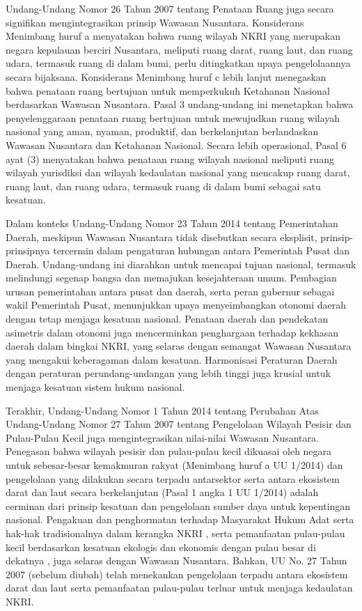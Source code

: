 \documentclass[12pt, a4paper]{article}
\begin{document}
Undang-Undang Nomor 26 Tahun 2007 tentang Penataan Ruang juga secara signifikan mengintegrasikan prinsip Wawasan Nusantara. Konsiderans Menimbang huruf a menyatakan bahwa ruang wilayah NKRI yang merupakan negara kepulauan berciri Nusantara, meliputi ruang darat, ruang laut, dan ruang udara, termasuk ruang di dalam bumi, perlu ditingkatkan upaya pengelolaannya secara bijaksana. Konsiderans Menimbang huruf c lebih lanjut menegaskan bahwa penataan ruang bertujuan untuk memperkukuh Ketahanan Nasional berdasarkan Wawasan Nusantara. Pasal 3 undang-undang ini menetapkan bahwa penyelenggaraan penataan ruang bertujuan untuk mewujudkan ruang wilayah nasional yang aman, nyaman, produktif, dan berkelanjutan berlandaskan Wawasan Nusantara dan Ketahanan Nasional. Secara lebih operasional, Pasal 6 ayat (3) menyatakan bahwa penataan ruang wilayah nasional meliputi ruang wilayah yurisdiksi dan wilayah kedaulatan nasional yang mencakup ruang darat, ruang laut, dan ruang udara, termasuk ruang di dalam bumi sebagai satu kesatuan.  

Dalam konteks Undang-Undang Nomor 23 Tahun 2014 tentang Pemerintahan Daerah, meskipun Wawasan Nusantara tidak disebutkan secara eksplisit, prinsip-prinsipnya tercermin dalam pengaturan hubungan antara Pemerintah Pusat dan Daerah. Undang-undang ini diarahkan untuk mencapai tujuan nasional, termasuk melindungi segenap bangsa dan memajukan kesejahteraan umum. Pembagian urusan pemerintahan antara pusat dan daerah, serta peran gubernur sebagai wakil Pemerintah Pusat, menunjukkan upaya menyeimbangkan otonomi daerah dengan tetap menjaga kesatuan nasional. Penataan daerah dan pendekatan asimetris dalam otonomi juga mencerminkan penghargaan terhadap kekhasan daerah dalam bingkai NKRI, yang selaras dengan semangat Wawasan Nusantara yang mengakui keberagaman dalam kesatuan. Harmonisasi Peraturan Daerah dengan peraturan perundang-undangan yang lebih tinggi juga krusial untuk menjaga kesatuan sistem hukum nasional.  

Terakhir, Undang-Undang Nomor 1 Tahun 2014 tentang Perubahan Atas Undang-Undang Nomor 27 Tahun 2007 tentang Pengelolaan Wilayah Pesisir dan Pulau-Pulau Kecil juga mengintegrasikan nilai-nilai Wawasan Nusantara. Penegasan bahwa wilayah pesisir dan pulau-pulau kecil dikuasai oleh negara untuk sebesar-besar kemakmuran rakyat (Menimbang huruf a UU 1/2014)  dan pengelolaan yang dilakukan secara terpadu antarsektor serta antara ekosistem darat dan laut secara berkelanjutan (Pasal 1 angka 1 UU 1/2014)  adalah cerminan dari prinsip kesatuan dan pengelolaan sumber daya untuk kepentingan nasional. Pengakuan dan penghormatan terhadap Masyarakat Hukum Adat serta hak-hak tradisionalnya dalam kerangka NKRI , serta pemanfaatan pulau-pulau kecil berdasarkan kesatuan ekologis dan ekonomis dengan pulau besar di dekatnya , juga selaras dengan Wawasan Nusantara. Bahkan, UU No. 27 Tahun 2007 (sebelum diubah) telah menekankan pengelolaan terpadu antara ekosistem darat dan laut serta pemanfaatan pulau-pulau terluar untuk menjaga kedaulatan NKRI.  
\end{document}
